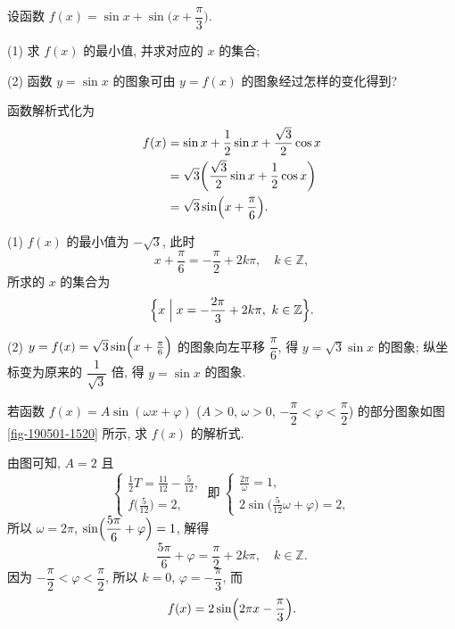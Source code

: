 \begin{exercise}
    设函数 $f(x)=\sin x+\sin\Big(x+\dfrac\pi3\Big)$.
    
    (1) 求 $f(x)$ 的最小值, 并求对应的 $x$ 的集合;
    
    (2) 函数 $y=\sin x$ 的图象可由 $y=f(x)$ 的图象经过怎样的变化得到?
\end{exercise}
\beginsolution
    函数解析式化为
    \[\begin{aligned}
        f(x)&= \sin x+\frac12\sin x+ \frac{\sqrt3}{2}\cos x\\
        &= \sqrt3\biggl(\frac{\sqrt3}{2}\sin x+ \frac12\cos x\biggr)\\
        &= \sqrt3\sin\Bigl(x+\frac\pi6\Bigr).
    \end{aligned}\]

    (1) $f(x)$ 的最小值为 $-\sqrt3$, 此时
    \[x+\frac\pi6= -\frac\pi2+2k\pi,\quad k\in\mathbb{Z},\]
    所求的 $x$ 的集合为
    \[\Bigl\{x\Bigm| x= -\frac{2\pi}3+ 2k\pi,\ k\in\mathbb{Z}\Bigr\}.\]

    (2) $y= f(x)= \sqrt3\sin\Bigl(x+\frac\pi6\Bigr)$ 的图象向左平移 $\dfrac\pi6$, 得 $y= \sqrt3\sin x$ 的图象; 纵坐标变为原来的 $\dfrac1{\sqrt3}$ 倍, 得 $y= \sin x$ 的图象. 
\endsolution

\begin{exercise}
    若函数 $f(x)=A\sin(\omega x+\varphi)$ ($A>0$, $\omega>0$, $-\dfrac\pi2< \varphi< \dfrac\pi2$) 的部分图象如图 \ref{fig-190501-1520} 所示, 求 $f(x)$ 的解析式.
\end{exercise}
\beginsolution
    由图可知, $A=2$ 且
    \[\left\{\!\!\begin{array}{l}
        \frac12 T= \frac{11}{12}-\frac{5}{12},\\
        f\biggl(\frac{5}{12}\biggl)=2,
    \end{array}\right.\ \text{即}\ 
    \left\{\!\!\begin{array}{l}
        \frac{2\pi}\omega= 1,\\
        2\sin\biggl(\frac{5}{12}\omega+\varphi\biggl)= 2,
    \end{array}\right.\]
    所以 $\omega= 2\pi$, $\sin\Bigl(\dfrac{5\pi}6+ \varphi\Bigr)= 1$, 解得
    \[\dfrac{5\pi}6+ \varphi= \frac\pi2+2k\pi,\quad k\in\mathbb{Z}.\]
    因为 $-\dfrac\pi2< \varphi< \dfrac\pi2$, 所以 $k=0$, $\varphi= -\dfrac{\pi}3$, 而
    \[f(x)= 2\sin\Bigl(2\pi x- \frac{\pi}3\Bigr).\]
\endsolution

